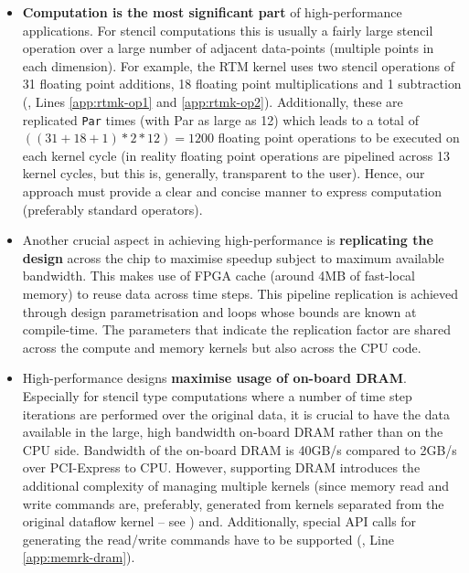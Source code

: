 \begin{itemize}

\item \textbf{Computation is the most significant part} of
  high-performance applications. For stencil computations this is
  usually a fairly large stencil operation over a large number of
  adjacent data-points (multiple points in each dimension). For
  example, the RTM kernel uses two stencil operations of 31 floating
  point additions, 18 floating point multiplications and 1
  subtraction (, Lines \ref{app:rtmk-op1} and
  \ref{app:rtmk-op2}).  Additionally, these are replicated
  \texttt{Par} times (with Par as large as 12) which leads to a total
  of $((31 + 18 + 1) * 2 * 12) = 1200 $ floating point operations to
  be executed on each kernel cycle (in reality floating point
  operations are pipelined across 13 kernel cycles, but this is,
  generally, transparent to the user). Hence, our approach must
  provide a clear and concise manner to express computation
  (preferably standard operators).

\item Another crucial aspect in achieving high-performance is
  \textbf{replicating the design} across the chip to maximise speedup
  subject to maximum available bandwidth. This makes use of FPGA cache
  (around 4MB of fast-local memory) to reuse data across time
  steps. This pipeline replication is achieved through design
  parametrisation and loops whose bounds are known at
  compile-time. The parameters that indicate the replication factor are
  shared across the compute and memory kernels but also across the CPU
  code.

\item High-performance designs \textbf{maximise usage of on-board
    DRAM}. Especially for stencil type computations where a number of
  time step iterations are performed over the original data, it is
  crucial to have the data available in the large, high bandwidth
  on-board DRAM rather than on the CPU side. Bandwidth of the on-board
  DRAM is 40GB/s compared to 2GB/s over PCI-Express to CPU. However,
  supporting DRAM introduces the additional complexity of managing
  multiple kernels (since memory read and write commands are,
  preferably, generated from kernels separated from the original
  dataflow kernel -- see )
  and. Additionally, special API calls for generating the read/write
  commands have to be supported (, Line
  \ref{app:memrk-dram}).


\end{itemize}
